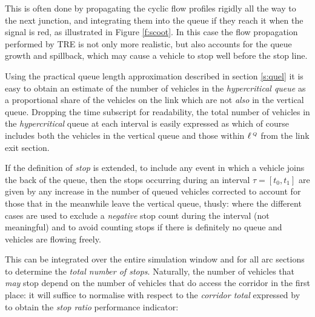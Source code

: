 This is often done by propagating the cyclic flow profiles rigidly all the way to the next junction, and integrating them into the queue if they reach it when the signal is red, as illustrated in Figure \ref{f:scoot}. In this case the flow propagation performed by TRE is not only more realistic, but also accounts for the queue growth and spillback, which may cause a vehicle to stop well before the stop line.

Using the practical queue length approximation described in section \ref{s:quel} it is easy to obtain an estimate of the number of vehicles in the \emph{hypercritical queue} as a proportional share of the vehicles on the link which are not \emph{also} in the vertical queue. Dropping the time subscript for readability, the total number of vehicles in the \emph{hypercritical} queue at each interval is easily expressed as
which of course includes both the vehicles in the vertical queue and those within $\ell_{}^{\scriptscriptstyle{\:Q}}$ from the link exit section.

If the definition of \emph{stop} is extended, to include any event in which a vehicle joins the back of the queue, then the stops occurring during an interval $ \tau = [ t_0, t_1 ] $ are given by any increase in the number of queued vehicles corrected to account for those that in the meanwhile leave the vertical queue, thusly:
where the different cases are used to exclude a \emph{negative} stop count during the interval (not meaningful) and to avoid counting stops if there is definitely no queue and vehicles are flowing freely.

This can be integrated over the entire simulation window and for all arc sections to determine the \emph{total number of stops}. Naturally, the number of vehicles that \emph{may} stop depend on the number of vehicles that do access the corridor in the first place: it will suffice to normalise with respect to the \emph{corridor total} expressed by  to obtain the \emph{stop ratio} performance indicator:

